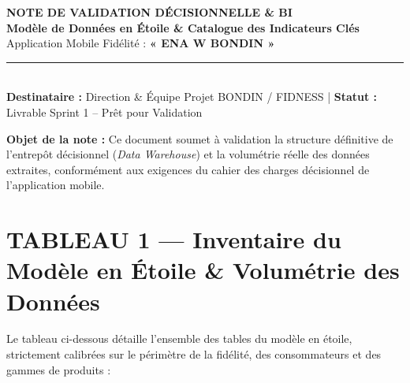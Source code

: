 \documentclass[11pt,a4paper]{article}
\begin{document}
\begin{center}
    {\LARGE \bfseries \textcolor{bondinred}{NOTE DE VALIDATION DÉCISIONNELLE \& BI}}\\[0.25cm]
    {\Large \bfseries \textcolor{fidnessblue}{Modèle de Données en Étoile \& Catalogue des Indicateurs Clés}}\\[0.15cm]
    {\large Application Mobile Fidélité : \textbf{« ENA W BONDIN »}}\\[0.3cm]
    \rule{\linewidth}{1.2pt}\\[0.15cm]
    \footnotesize \textbf{Destinataire :} Direction \& Équipe Projet BONDIN / FIDNESS \quad | \quad \textbf{Statut :} Livrable Sprint 1 -- Prêt pour Validation
\end{center}

\vspace{0.2cm}

\noindent \textbf{Objet de la note :} Ce document soumet à validation la structure définitive de l'entrepôt décisionnel (\textit{Data Warehouse}) et la volumétrie réelle des données extraites, conformément aux exigences du cahier des charges décisionnel de l'application mobile.

\vspace{0.3cm}

\section*{\textcolor{fidnessblue}{TABLEAU 1 --- Inventaire du Modèle en Étoile \& Volumétrie des Données}}

Le tableau ci-dessous détaille l'ensemble des tables du modèle en étoile, strictement calibrées sur le périmètre de la fidélité, des consommateurs et des gammes de produits :
\end{document}
